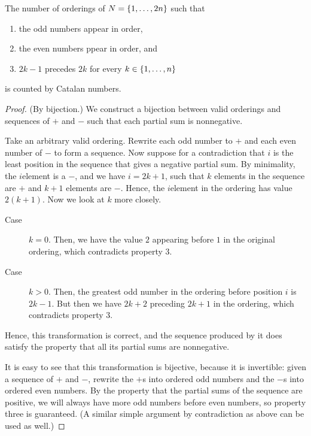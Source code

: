 \documentclass[11pt]{article}
\begin{document}

\begin{prop}
    The number of orderings of $N = \left\{1,\ldots,2n\right\}$ such that
    \begin{enumerate}
        \item
            the odd numbers appear in order,
        \item
            the even numbers ppear in order, and
        \item
            $2k-1$ precedes $2k$ for every $k \in \left\{1,\ldots,n\right\}$
    \end{enumerate}
    is counted by Catalan numbers.
\end{prop}

\begin{proof}{(By bijection.)}
    We construct a bijection between valid orderings and sequences of $+$ and
    $-$ such that each partial sum is nonnegative.

    Take an arbitrary valid ordering. Rewrite each odd number to $+$ and each
    even number of $-$ to form a sequence.
    Now suppose for a contradiction that $i$ is the least position in the
    sequence that gives a negative partial sum.
    By minimality, the $i$\th element is a $-$, and we have $i = 2k + 1$, such
    that $k$ elements in the sequence are $+$ and $k + 1$ elements are $-$.
    Hence, the $i$\th element in the ordering has value $2(k + 1)$.
    Now we look at $k$ more closely.
    \begin{description}
        \item[Case] $k = 0$.
            Then, we have the value $2$ appearing before $1$ in the original
            ordering, which contradicts property 3.
        \item[Case] $k > 0$.
            Then, the greatest odd number in the ordering before position $i$
            is $2k - 1$. But then we have $2k + 2$ preceding $2k + 1$ in the
            ordering, which contradicts property 3.
    \end{description}

    Hence, this transformation is correct, and the sequence produced by it does
    satisfy the property that all its partial sums are nonnegative.

    It is easy to see that this transformation is bijective, because it is
    invertible: given a sequence of $+$ and $-$, rewrite the $+$s into ordered
    odd numbers and the $-$s into ordered even numbers. By the property that
    the partial sums of the sequence are positive, we will always have more odd
    numbers before even numbers, so property three is guaranteed.
    (A similar simple argument by contradiction as above can be used as well.)
\end{proof}
\end{document}
